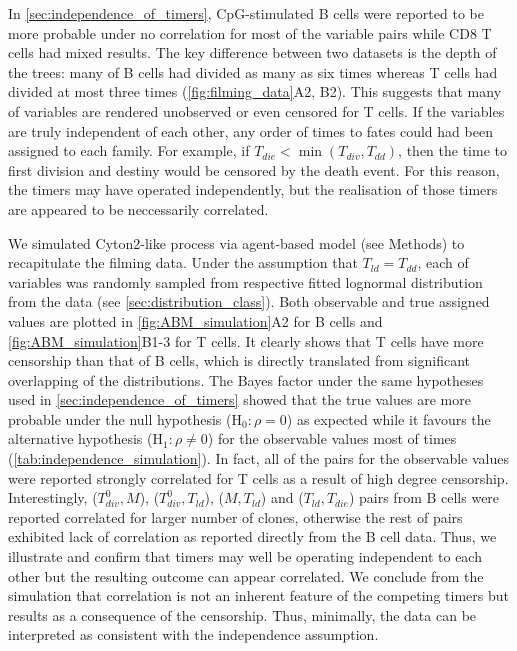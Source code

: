 \documentclass[11pt, a4paper]{article}
\begin{document}
\noindent
In \cref{sec:independence_of_timers}, CpG-stimulated B cells were reported to be more probable under no correlation for most of the variable pairs while CD8 T cells had mixed results. The key difference between two datasets is the depth of the trees: many of B cells had divided as many as six times whereas T cells had divided at most three times (\cref{fig:filming_data}A2, B2). This suggests that many of variables are rendered unobserved or even censored for T cells. If the variables are truly independent of each other, any order of times to fates could had been assigned to each family. For example, if $T_{die} < \min(T_{div}, T_{dd})$, then the time to first division and destiny would be censored by the death event. For this reason, the timers may have operated independently, but the realisation of those timers are appeared to be neccessarily correlated.

We simulated Cyton2-like process via agent-based model (see Methods) to recapitulate the filming data. Under the assumption that $T_{ld} = T_{dd}$, each of variables was randomly sampled from respective fitted lognormal distribution from the data (see \cref{sec:distribution_class}). Both observable and true assigned values are plotted in \cref{fig:ABM_simulation}A2 for B cells and \cref{fig:ABM_simulation}B1-3 for T cells. It clearly shows that T cells have more censorship than that of B cells, which is directly translated from significant overlapping of the distributions. The Bayes factor under the same hypotheses used in \cref{sec:independence_of_timers} showed that the true values are more probable under the null hypothesis (H$_0: \rho=0$) as expected while it favours the alternative hypothesis (H$_1: \rho \neq 0$) for the observable values most of times (\cref{tab:independence_simulation}). In fact, all of the pairs for the observable values were reported strongly correlated for T cells as a result of high degree censorship. Interestingly, ($T_{div}^0, M$), ($T_{div}^0, T_{ld}$), ($M, T_{ld}$) and ($T_{ld}, T_{die}$) pairs from B cells were reported correlated for larger number of clones, otherwise the rest of pairs exhibited lack of correlation as reported directly from the B cell data. Thus, we illustrate and confirm that timers may well be operating independent to each other but the resulting outcome can appear correlated. We conclude from the simulation that correlation is not an inherent feature of the competing timers but results as a consequence of the censorship. Thus, minimally, the data can be interpreted as consistent with the independence assumption.
\end{document}
